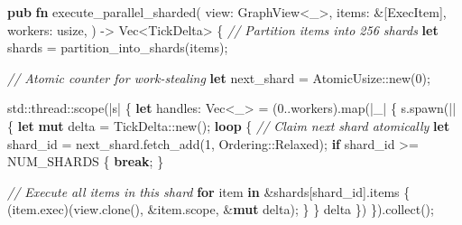 \documentclass[
  11pt,
]{book}
\newenvironment{Shaded}{}{}
\newcommand{\CommentTok}[1]{\textcolor[rgb]{0.38,0.63,0.69}{\textit{#1}}}
\newcommand{\ControlFlowTok}[1]{\textcolor[rgb]{0.00,0.44,0.13}{\textbf{#1}}}
\newcommand{\DataTypeTok}[1]{\textcolor[rgb]{0.56,0.13,0.00}{#1}}
\newcommand{\DecValTok}[1]{\textcolor[rgb]{0.25,0.63,0.44}{#1}}
\newcommand{\KeywordTok}[1]{\textcolor[rgb]{0.00,0.44,0.13}{\textbf{#1}}}
\newcommand{\NormalTok}[1]{#1}
\newcommand{\OperatorTok}[1]{\textcolor[rgb]{0.40,0.40,0.40}{#1}}
\newcommand{\OtherTok}[1]{\textcolor[rgb]{0.00,0.44,0.13}{#1}}
\newcommand{\PreprocessorTok}[1]{\textcolor[rgb]{0.74,0.48,0.00}{#1}}
\begin{document}
\begin{Shaded}
\begin{Highlighting}[]
\KeywordTok{pub} \KeywordTok{fn}\NormalTok{ execute\_parallel\_sharded(}
\NormalTok{    view}\OperatorTok{:}\NormalTok{ GraphView}\OperatorTok{\textless{}}\OtherTok{\textquotesingle{}\_}\OperatorTok{\textgreater{},}
\NormalTok{    items}\OperatorTok{:} \OperatorTok{\&}\NormalTok{[ExecItem]}\OperatorTok{,}
\NormalTok{    workers}\OperatorTok{:} \DataTypeTok{usize}\OperatorTok{,}
\NormalTok{) }\OperatorTok{{-}\textgreater{}} \DataTypeTok{Vec}\OperatorTok{\textless{}}\NormalTok{TickDelta}\OperatorTok{\textgreater{}} \OperatorTok{\{}
    \CommentTok{// Partition items into 256 shards}
    \KeywordTok{let}\NormalTok{ shards }\OperatorTok{=}\NormalTok{ partition\_into\_shards(items)}\OperatorTok{;}

    \CommentTok{// Atomic counter for work{-}stealing}
    \KeywordTok{let}\NormalTok{ next\_shard }\OperatorTok{=} \PreprocessorTok{AtomicUsize::}\NormalTok{new(}\DecValTok{0}\NormalTok{)}\OperatorTok{;}

    \PreprocessorTok{std::thread::}\NormalTok{scope(}\OperatorTok{|}\NormalTok{s}\OperatorTok{|} \OperatorTok{\{}
        \KeywordTok{let}\NormalTok{ handles}\OperatorTok{:} \DataTypeTok{Vec}\OperatorTok{\textless{}}\NormalTok{\_}\OperatorTok{\textgreater{}} \OperatorTok{=}\NormalTok{ (}\DecValTok{0}\OperatorTok{..}\NormalTok{workers)}\OperatorTok{.}\NormalTok{map(}\OperatorTok{|}\NormalTok{\_}\OperatorTok{|} \OperatorTok{\{}
\NormalTok{            s}\OperatorTok{.}\NormalTok{spawn(}\OperatorTok{||} \OperatorTok{\{}
                \KeywordTok{let} \KeywordTok{mut}\NormalTok{ delta }\OperatorTok{=} \PreprocessorTok{TickDelta::}\NormalTok{new()}\OperatorTok{;}
                \ControlFlowTok{loop} \OperatorTok{\{}
                    \CommentTok{// Claim next shard atomically}
                    \KeywordTok{let}\NormalTok{ shard\_id }\OperatorTok{=}\NormalTok{ next\_shard}\OperatorTok{.}\NormalTok{fetch\_add(}\DecValTok{1}\OperatorTok{,} \PreprocessorTok{Ordering::}\NormalTok{Relaxed)}\OperatorTok{;}
                    \ControlFlowTok{if}\NormalTok{ shard\_id }\OperatorTok{\textgreater{}=}\NormalTok{ NUM\_SHARDS }\OperatorTok{\{} \ControlFlowTok{break}\OperatorTok{;} \OperatorTok{\}}

                    \CommentTok{// Execute all items in this shard}
                    \ControlFlowTok{for}\NormalTok{ item }\KeywordTok{in} \OperatorTok{\&}\NormalTok{shards[shard\_id]}\OperatorTok{.}\NormalTok{items }\OperatorTok{\{}
\NormalTok{                        (item}\OperatorTok{.}\NormalTok{exec)(view}\OperatorTok{.}\NormalTok{clone()}\OperatorTok{,} \OperatorTok{\&}\NormalTok{item}\OperatorTok{.}\NormalTok{scope}\OperatorTok{,} \OperatorTok{\&}\KeywordTok{mut}\NormalTok{ delta)}\OperatorTok{;}
                    \OperatorTok{\}}
                \OperatorTok{\}}
\NormalTok{                delta}
            \OperatorTok{\}}\NormalTok{)}
        \OperatorTok{\}}\NormalTok{)}\OperatorTok{.}\NormalTok{collect()}\OperatorTok{;}


\end{Highlighting}
\end{Shaded}
\end{document}
